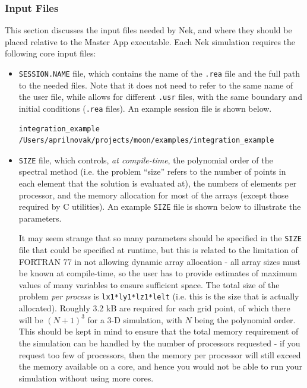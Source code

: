 \documentclass[10pt]{article}
\numberwithin{equation}{section} %
\begin{document}
\subsubsection{Input Files}
This section discusses the input files needed by Nek, and where they should be placed relative to the Master App executable. Each Nek simulation requires the following core input files:

\begin{itemize}
\item {\tt SESSION.NAME} file, which contains the name of the {\tt .rea} file and the full path to the needed files. Note that it does not need to refer to the same name of the user file, while allows for different {\tt .usr} files, with the same boundary and initial conditions ({\tt .rea} files). An example session file is shown below. 

\begin{lstlisting}
integration_example
/Users/aprilnovak/projects/moon/examples/integration_example
\end{lstlisting}

\item {\tt SIZE} file, which controls, {\it at compile-time}, the polynomial order of the spectral method (i.e. the problem ``size'' refers to the number of points in each element that the solution is evaluated at), the numbers of elements per processor, and the memory allocation for most of the arrays (except those required by C utilities). An example {\tt SIZE} file is shown below to illustrate the parameters. 

It may seem strange that so many parameters should be specified in the {\tt SIZE} file that could be specified at runtime, but this is related to the limitation of FORTRAN 77 in not allowing dynamic array allocation - all array sizes must be known at compile-time, so the user has to provide estimates of maximum values of many variables to ensure sufficient space. The total size of the problem {\it per process} is {\tt lx1*ly1*lz1*lelt} (i.e. this is the size that is actually allocated). Roughly 3.2 kB are required for each grid point, of which there will be \((N+1)^3\) for a 3-D simulation, with \(N\) being the polynomial order. This should be kept in mind to ensure that the total memory requirement of the simulation can be handled by the number of processors requested - if you request too few of processors, then the memory per processor will still exceed the memory available on a core, and hence you would not be able to run your simulation without using more cores. 


\end{itemize}
\end{document}
